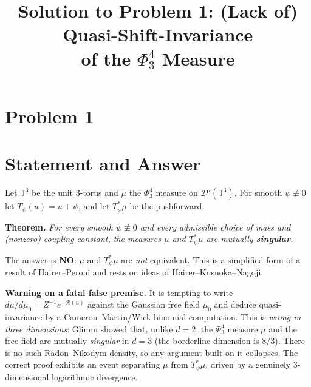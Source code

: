 \clearpage
\section*{Problem 1}
\begingroup
\hypersetup{colorlinks=true,
            linkcolor=blue!50!black,
            citecolor=blue!50!black,
            urlcolor=blue!50!black}
\newcommand{\qoneT}{\mathbb{T}}
\newcommand{\qoneR}{\mathbb{R}}
\newcommand{\qoneN}{\mathbb{N}}
\newcommand{\qoneC}{\mathcal{C}}
\newcommand{\qoneD}{\mathcal{D}}
\newcommand{\qoneE}{\mathbb{E}}
\newcommand{\qoneHp}{H}      %
\newcommand{\qonePN}{P_N}
\newcommand{\qoneLin}{\mathbf{l}}   %
\newcommand{\qoneLsq}{\mathbf{q}}   %
\newcommand{\qoneLcb}{\mathbf{c}}   %
\newcommand{\qoneIqc}{\mathbf{C}}   %
\newtheorem{qonetheorem}{Theorem}
\newtheorem{qonelemma}{Lemma}
\newtheorem{qoneproposition}{Proposition}
\newtheorem{qonecorollary}{Corollary}
\title{Solution to Problem 1: (Lack of) Quasi-Shift-Invariance\\
of the $\Phi^4_3$ Measure}
\author{}
\date{}
\maketitle


\section*{Statement and Answer}

Let $\qoneT^3$ be the unit $3$-torus and $\mu$ the $\Phi^4_3$ measure on
$\qoneD'(\qoneT^3)$. For smooth $\psi\not\equiv0$ let $T_\psi(u)=u+\psi$, and let
$T_\psi^*\mu$ be the pushforward.

\medskip
\noindent\textbf{Theorem.} \emph{For every smooth $\psi\not\equiv0$ and every
admissible choice of mass and (nonzero) coupling constant, the measures $\mu$ and
$T_\psi^*\mu$ are mutually \textbf{singular}.}

\medskip
\noindent The answer is \textbf{NO}: $\mu$ and $T_\psi^*\mu$ are \emph{not}
equivalent. This is a simplified form of a result of Hairer--Peroni and rests on
ideas of Hairer--Kusuoka--Nagoji.

\medskip
\noindent\textbf{Warning on a fatal false premise.} It is tempting to write
$d\mu/d\mu_0=Z^{-1}e^{-\mathcal R(u)}$ against the Gaussian free field $\mu_0$
and deduce quasi-invariance by a Cameron--Martin/Wick-binomial computation. This
is \emph{wrong in three dimensions}: Glimm showed that, unlike $d=2$, the
$\Phi^4_3$ measure $\mu$ and the free field are mutually \emph{singular} in
$d=3$ (the borderline dimension is $8/3$). There is no such Radon--Nikodym
density, so any argument built on it collapses. The correct proof exhibits an
event separating $\mu$ from $T_\psi^*\mu$, driven by a genuinely
$3$-dimensional logarithmic divergence.


